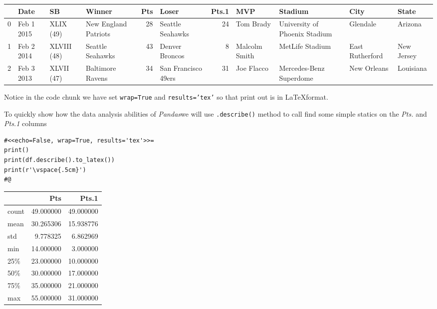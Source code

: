 \documentclass[a4paper,11pt,final]{article}
\newcommand{\latex}{\LaTeX\space}
\newcommand{\pandas}{\emph{Pandas}\space}
\begin{document}
\begin{tabular}{llllrlrllll}
\toprule
{} &        Date &           SB &                Winner &  Pts &
Loser &  Pts.1 &            MVP &                        Stadium &
City &       State \\
\midrule
0 &  Feb 1 2015 &    XLIX (49) &  New England Patriots &   28 &
Seattle Seahawks &     24 &      Tom Brady &  University of Phoenix
Stadium &         Glendale &     Arizona \\
1 &  Feb 2 2014 &  XLVIII (48) &      Seattle Seahawks &   43 &
Denver Broncos &      8 &  Malcolm Smith &                MetLife
Stadium &  East Rutherford &  New Jersey \\
2 &  Feb 3 2013 &   XLVII (47) &      Baltimore Ravens &   34 &  San
Francisco 49ers &     31 &     Joe Flacco &        Mercedes-Benz
Superdome &      New Orleans &   Louisiana \\
\bottomrule
\end{tabular}

\vspace{.5cm}


           Notice in the code chunk we have set \texttt{wrap=True} and \texttt{results='tex'} so that print out is in \latex format.
          
           To quickly show how the data analysis abilities of \pandas we will use \texttt{.describe()} method to call find some simple statics on the \emph{Pts.} and \emph{Pts.1} columns
       
        \begin{verbatim}
#<<echo=False, wrap=True, results='tex'>>=
print()
print(df.describe().to_latex())
print(r'\vspace{.5cm}')
#@
        \end{verbatim}



\begin{tabular}{lrr}
\toprule
{} &        Pts &      Pts.1 \\
\midrule
count &  49.000000 &  49.000000 \\
mean  &  30.265306 &  15.938776 \\
std   &   9.778325 &   6.862969 \\
min   &  14.000000 &   3.000000 \\
25\%   &  23.000000 &  10.000000 \\
50\%   &  30.000000 &  17.000000 \\
75\%   &  35.000000 &  21.000000 \\
max   &  55.000000 &  31.000000 \\
\bottomrule
\end{tabular}
\end{document}

